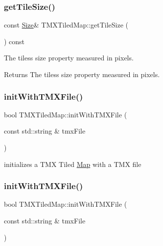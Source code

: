 \subsubsection{\texorpdfstring{get\+Tile\+Size()}{getTileSize()}\hspace{0.1cm}{\footnotesize\ttfamily [2/2]}}
{\footnotesize\ttfamily const \hyperlink{classSize}{Size}\& T\+M\+X\+Tiled\+Map\+::get\+Tile\+Size (\begin{DoxyParamCaption}{ }\end{DoxyParamCaption}) const\hspace{0.3cm}{\ttfamily [inline]}}

The tiles\textquotesingle{}s size property measured in pixels.

\begin{DoxyReturn}{Returns}
The tiles\textquotesingle{}s size property measured in pixels. 
\end{DoxyReturn}
\mbox{\label{classTMXTiledMap_a4e75b0b3333616d3898b6119644e4137}} 
\subsubsection{\texorpdfstring{init\+With\+T\+M\+X\+File()}{initWithTMXFile()}\hspace{0.1cm}{\footnotesize\ttfamily [1/2]}}
{\footnotesize\ttfamily bool T\+M\+X\+Tiled\+Map\+::init\+With\+T\+M\+X\+File (\begin{DoxyParamCaption}\item[{const std\+::string \&}]{tmx\+File }\end{DoxyParamCaption})}

initializes a T\+MX Tiled \hyperlink{classMap}{Map} with a T\+MX file \mbox{\label{classTMXTiledMap_a4e75b0b3333616d3898b6119644e4137}} 
\subsubsection{\texorpdfstring{init\+With\+T\+M\+X\+File()}{initWithTMXFile()}\hspace{0.1cm}{\footnotesize\ttfamily [2/2]}}
{\footnotesize\ttfamily bool T\+M\+X\+Tiled\+Map\+::init\+With\+T\+M\+X\+File (\begin{DoxyParamCaption}\item[{const std\+::string \&}]{tmx\+File }\end{DoxyParamCaption})}

